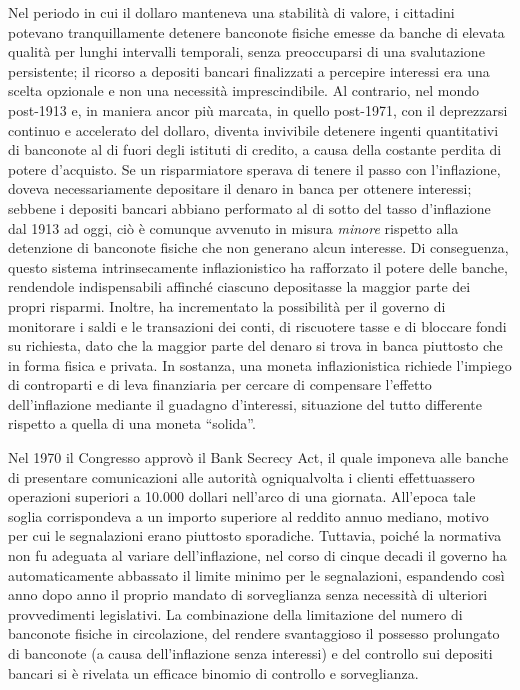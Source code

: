 \documentclass[
  a5paper,
  smalldemyvopaper,10pt,twoside,onecolumn,openright,extrafontsizes,hidelinks]{memoir}
\begin{document}
Nel periodo in cui il dollaro manteneva una stabilità di valore, i
cittadini potevano tranquillamente detenere banconote fisiche emesse da
banche di elevata qualità per lunghi intervalli temporali, senza
preoccuparsi di una svalutazione persistente; il ricorso a depositi
bancari finalizzati a percepire interessi era una scelta opzionale e non
una necessità imprescindibile. Al contrario, nel mondo post-1913 e, in
maniera ancor più marcata, in quello post-1971, con il deprezzarsi
continuo e accelerato del dollaro, diventa invivibile detenere ingenti
quantitativi di banconote al di fuori degli istituti di credito, a causa
della costante perdita di potere d'acquisto. Se un risparmiatore sperava
di tenere il passo con l'inflazione, doveva necessariamente depositare
il denaro in banca per ottenere interessi; sebbene i depositi bancari
abbiano performato al di sotto del tasso d'inflazione dal 1913 ad oggi,
ciò è comunque avvenuto in misura \emph{minore} rispetto alla detenzione
di banconote fisiche che non generano alcun interesse. Di conseguenza,
questo sistema intrinsecamente inflazionistico ha rafforzato il potere
delle banche, rendendole indispensabili affinché ciascuno depositasse la
maggior parte dei propri risparmi. Inoltre, ha incrementato la
possibilità per il governo di monitorare i saldi e le transazioni dei
conti, di riscuotere tasse e di bloccare fondi su richiesta, dato che la
maggior parte del denaro si trova in banca piuttosto che in forma fisica
e privata. In sostanza, una moneta inflazionistica richiede l'impiego di
controparti e di leva finanziaria per cercare di compensare l'effetto
dell'inflazione mediante il guadagno d'interessi, situazione del tutto
differente rispetto a quella di una moneta ``solida''.

Nel 1970 il Congresso approvò il Bank Secrecy Act, il quale imponeva
alle banche di presentare comunicazioni alle autorità ogniqualvolta i
clienti effettuassero operazioni superiori a 10.000 dollari nell'arco di
una giornata. All'epoca tale soglia corrispondeva a un importo superiore
al reddito annuo mediano, motivo per cui le segnalazioni erano piuttosto
sporadiche. Tuttavia, poiché la normativa non fu adeguata al variare
dell'inflazione, nel corso di cinque decadi il governo ha
automaticamente abbassato il limite minimo per le segnalazioni,
espandendo così anno dopo anno il proprio mandato di sorveglianza senza
necessità di ulteriori provvedimenti legislativi. La combinazione della
limitazione del numero di banconote fisiche in circolazione, del rendere
svantaggioso il possesso prolungato di banconote (a causa
dell'inflazione senza interessi) e del controllo sui depositi bancari si
è rivelata un efficace binomio di controllo e sorveglianza.
\end{document}
